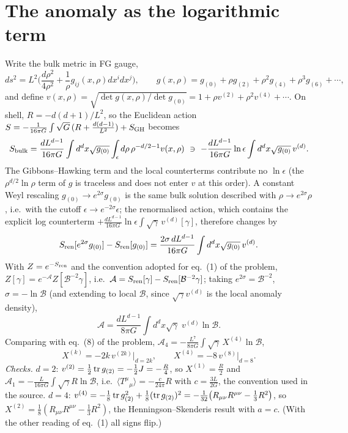 \section{The anomaly as the logarithmic term}
Write the bulk metric in FG gauge,
\begin{equation}
ds^2=L^2\Big(\frac{d\rho^2}{4\rho^2}+\frac1\rho g_{ij}(x,\rho)dx^idx^j\Big),\qquad
g(x,\rho)=g_{(0)}+\rho g_{(2)}+\rho^2g_{(4)}+\rho^3g_{(6)}+\cdots,
\end{equation}
and define $v(x,\rho)=\sqrt{\det g(x,\rho)/\det g_{(0)}}=1+\rho v^{(2)}+\rho^2v^{(4)}+\cdots$. On shell, $R=-d(d+1)/L^2$, so the Euclidean action $S=-\frac{1}{16\pi G}\int\sqrt G\,(R+\frac{d(d-1)}{L^2})+S_{\rm GH}$ becomes
\begin{equation}
S_{\rm bulk}=\frac{dL^{d-1}}{16\pi G}\int d^dx\sqrt{g_{(0)}}\int_\epsilon d\rho\,\rho^{-d/2-1}v(x,\rho)\ \ni\ -\frac{dL^{d-1}}{16\pi G}\ln\epsilon\int d^dx\sqrt{g_{(0)}}\,v^{(d)} .
\end{equation}
The Gibbons--Hawking term and the local counterterms contribute no $\ln\epsilon$ (the $\rho^{d/2}\ln\rho$ term of $g$ is traceless and does not enter $v$ at this order). A constant Weyl rescaling $g_{(0)}\to e^{2\sigma}g_{(0)}$ is the same bulk solution described with $\rho\to e^{2\sigma}\rho$, i.e.\ with the cutoff $\epsilon\to e^{-2\sigma}\epsilon$; the renormalised action, which contains the explicit log counterterm $+\frac{dL^{d-1}}{16\pi G}\ln\epsilon\int\sqrt{\gamma}\,v^{(d)}[\gamma]$, therefore changes by
\begin{equation}
S_{\rm ren}[e^{2\sigma}g_{(0)}]-S_{\rm ren}[g_{(0)}]=\frac{2\sigma\,dL^{d-1}}{16\pi G}\int d^dx\sqrt{g_{(0)}}\,v^{(d)} .
\end{equation}
With $Z=e^{-S_{\rm ren}}$ and the convention adopted for eq.~(1) of the problem, $Z[\gamma]=e^{-\mathcal A}Z[\mathcal B^{-2}\gamma]$, i.e.\ $\mathcal A=S_{\rm ren}[\gamma]-S_{\rm ren}[\mathcal B^{-2}\gamma]$; taking $e^{2\sigma}=\mathcal B^{-2}$, $\sigma=-\ln\mathcal B$ (and extending to local $\mathcal B$, since $\sqrt\gamma v^{(d)}$ is the local anomaly density),
\begin{equation}
\mathcal A=\frac{dL^{d-1}}{8\pi G}\int d^dx\sqrt{\gamma}\;v^{(d)}\ln\mathcal B .
\end{equation}
Comparing with eq.~(8) of the problem, $\mathcal A_4=-\frac{L^7}{8\pi G}\int\sqrt\gamma\,X^{(4)}\ln\mathcal B$,
\begin{equation}
\boxed{X^{(k)}=-2k\,v^{(2k)}\big|_{d=2k}},\qquad X^{(4)}=-8\,v^{(8)}\big|_{d=8}.
\label{eq:X}
\end{equation}
\emph{Checks.} $d=2$: $v^{(2)}=\frac12\operatorname{tr} g_{(2)}=-\frac12J=-\frac{R}{4}$, so $X^{(1)}=\frac R2$ and $\mathcal A_1=-\frac{L}{16\pi G}\int\sqrt\gamma R\ln\mathcal B$, i.e.\ $\langle T^\mu{}_\mu\rangle=-\frac{c}{24\pi}R$ with $c=\frac{3L}{2G}$, the convention used in the source. $d=4$: $v^{(4)}=-\frac18\operatorname{tr} g_{(2)}^2+\frac18(\operatorname{tr} g_{(2)})^2=-\frac1{32}\big(R_{\mu\nu}R^{\mu\nu}-\frac13R^2\big)$, so $X^{(2)}=\frac18(R_{\mu\nu}R^{\mu\nu}-\frac13R^2)$, the Henningson--Skenderis result with $a=c$. (With the other reading of eq.~(1) all signs flip.)

